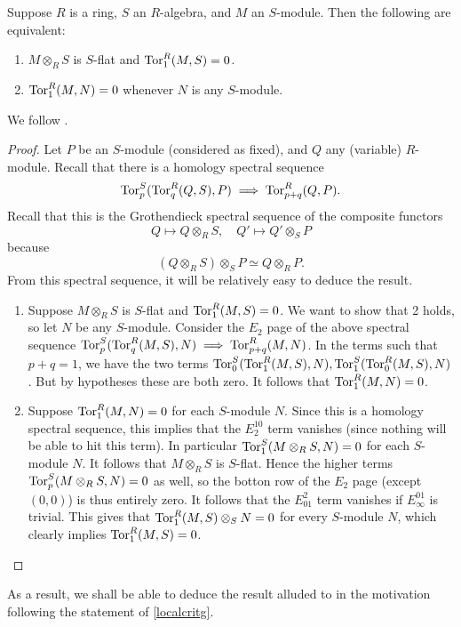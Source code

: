 \begin{lemma}[Serre] \label{serrelemma}
Suppose $R$ is a ring, $S$ an $R$-algebra, and $M$ an $S$-module. 
Then the following are equivalent:
\begin{enumerate}
\item $M \otimes_R S$ is $S$-flat and $\operatorname{Tor}_1^R(M, S) = 0$. 
\item $\operatorname{Tor}_1^R(M, N) = 0$ whenever $N$ is any  $S$-module.
\end{enumerate}
\end{lemma} 
We follow \cite{SGA1}.
\begin{proof} 
Let $P$ be an $S$-module (considered as fixed), and $Q$ any (variable) $R$-module.
Recall that there is a homology spectral sequence
\[ \operatorname{Tor}_p^S(\operatorname{Tor}_q^R(Q, S), P) \implies \operatorname{Tor}_{p+q}^R(Q,P).  \]
Recall that this is the Grothendieck spectral sequence of the composite functors
\[ Q \mapsto Q \otimes_R S, \quad Q' \mapsto Q' \otimes_S P  \]
because
\[ (Q \otimes_R S) \otimes_S P \simeq Q \otimes_R P.  \]
From this spectral sequence, it will be relatively easy to deduce
the result.
\begin{enumerate}
\item Suppose $M \otimes_R S$ is $S$-flat and $\operatorname{Tor}_1^R(M, S) = 0$.
We want to show that 2 holds, so let $N$ be any $S$-module.
Consider the $E_2$ page of the above spectral sequence
 $\operatorname{Tor}_p^S(\operatorname{Tor}_q^R(M, S), N) \implies \operatorname{Tor}_{p+q}^R(M, N)$.
 In the terms such that $p+q = 1$, we have the two terms 
$\operatorname{Tor}_0^S(\operatorname{Tor}_1^R(M, S), N), \operatorname{Tor}_1^S(\operatorname{Tor}_0^R(M, S),N)$.
But by hypotheses these are both zero. It follows that $\operatorname{Tor}_1^R(M, N) = 0$.
\item Suppose $\operatorname{Tor}_1^R(M, N) = 0$ for each $S$-module $N$.
Since this is a {homology} spectral sequence, this implies that the 
$E_2^{10}$ term vanishes (since nothing will be able to hit this term).
In particular $\operatorname{Tor}_1^S(M \otimes_R  S, N) = 0$ for each $S$-module $N$.
It follows that $M \otimes_R S$ is $S$-flat.
Hence the higher terms $\operatorname{Tor}_p^S(M \otimes_R S, N) = 0$ as well, so the botton row of
the $E_2$ page (except $(0,0)$) is thus entirely zero. It follows that the
$E_{01}^2$ term vanishes if $E_{\infty}^{01}$ is trivial.
This gives that $\operatorname{Tor}_1^R(M, S) \otimes_S N = 0$ for every $S$-module $N$,
which clearly implies $\operatorname{Tor}_1^R(M, S) = 0$.
\end{enumerate}
\end{proof} 

As a result, we shall be able to deduce the result alluded to in the motivation
following the statement of \cref{localcritg}.

